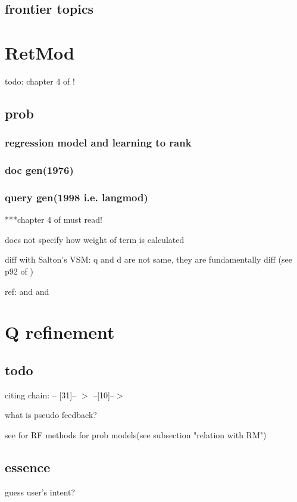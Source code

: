\documentclass[•]{article}
\begin{document}
\subsection{frontier topics}


\section{RetMod}
todo: chapter 4 of \cite{Ponte1998}!

\subsection{prob}
\subsubsection{regression model and learning to rank}

\subsubsection{doc gen(1976)}

\subsubsection{query gen(1998 \cite{Ponte1998} \cite{Ponte1998a} i.e. langmod)}
***chapter 4 of \cite{Ponte1998} must read!

does not specify how weight of term is calculated

diff with Salton's VSM: q and d are not same, they are fundamentally diff (see p92 of \cite{Ponte1998a})

ref: \cite{Ponte1998} and \cite{Ponte1998a} and \cite{Fuhr1992}

\section{Q refinement}

\subsection{todo}
citing chain: \cite{Lv2011} -- [31]-- $>$ \cite{Zhai2001} --[10]--$>$ \cite{Ponte1998}

what is pseudo feedback?

see \cite{Lv2011} for RF methods for prob models(see subsection "relation with RM")

\subsection{essence}
guess user's intent? 
\end{document}
